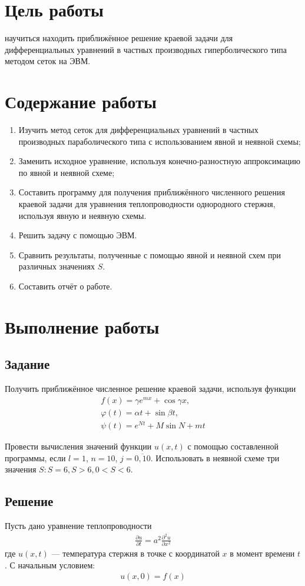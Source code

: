 \section{Цель работы}
научиться находить приближённое решение краевой задачи для дифференциальных уравнений в частных производных гиперболического типа методом сеток на ЭВМ.

\section{Содержание работы}
\begin{enumerate}
	\item Изучить метод сеток для дифференциальных уравнений в частных производных параболического типа с использованием явной и неявной схемы;
	\item Заменить исходное уравнение, используя конечно-разностную аппроксимацию по явной и неявной схеме;
	\item Составить программу для получения приближённого численного решения краевой задачи для уравнения теплопроводности однородного стержня, используя явную и неявную схемы.
	\item Решить задачу с помощью ЭВМ.
	\item Сравнить результаты, полученные с помощью явной и неявной схем при различных значениях \(S\).
	\item Составить отчёт о работе.
\end{enumerate}

\section{Выполнение работы}
\subsection{Задание}
Получить приближённое численное решение краевой задачи, используя функции
\begin{align}
	f(x) = \gamma e^{m x} + \cos{\gamma x}, \\
	\varphi(t) = \alpha t + \sin{\beta t},  \\
	\psi(t) = e^{N t} + M \sin{N + m t}
\end{align}

Провести вычисления значений функции \(u(x,t)\) с помощью составленной программы, если \(l = 1\), \(n = 10\), \(j = \overline{0, 10}\). Использовать в неявной схеме три значения \(S\colon S=6, S>6, 0<S<6\).

\subsection{Решение}
Пусть дано уравнение теплопроводности
\begin{align} \label{eq:init-u-diff}
	\frac{\partial u}{\partial t} = a^2 \frac{\partial^2 u}{\partial x^2}
\end{align}
где \(u(x,t)\) ---  температура стержня в точке с координатой \(x\) в момент времени \(t\).
С начальным условием:
\begin{align}\label{eq:init-cond}
	u(x, 0) = f(x)
\end{align}

